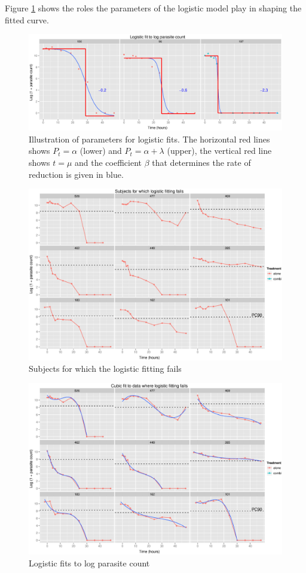 Figure \ref{logparms} shows the roles the parameters of the logistic model play in shaping the fitted curve.
\begin{figure}[h]
\includegraphics[width=6.1in]{logparms.eps} 
\caption{Illustration of parameters for logistic fits.\newline
The horizontal red lines shows $P_t=\alpha$ (lower) and $P_t=\alpha+\lambda$ (upper), the vertical red line shows $t=\mu$ and the coefficient $\beta$ that determines the rate of reduction is given in blue.}\label{logparms}
\end{figure}

\begin{figure}[p]
\includegraphics[width=6.1in]{failures.eps} 
\caption{Subjects for which the logistic fitting fails}\label{failures}
\end{figure}
\begin{figure}[p]
\includegraphics[width=6.1in]{failcubics.eps} 
\caption{Logistic fits to log parasite count}\label{failcubics}
\end{figure}

